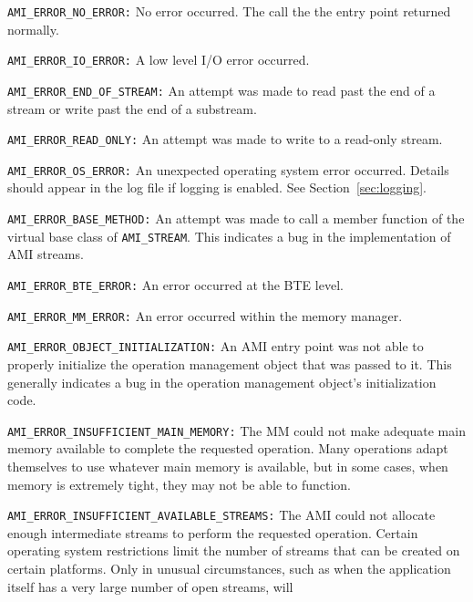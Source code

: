 \begin{description}
\item\lstinline|AMI_ERROR_NO_ERROR:| No error occurred.  The call the the
  entry point returned normally.
\item\lstinline|AMI_ERROR_IO_ERROR:| A low level I/O error occurred.
\item\lstinline|AMI_ERROR_END_OF_STREAM:| An attempt was made to read
  past the end of a stream or write past the end of a substream.
\item\lstinline|AMI_ERROR_READ_ONLY:| An attempt was made to write to a
  read-only stream.
\item\lstinline|AMI_ERROR_OS_ERROR:|  An unexpected operating system
  error occurred.  Details should appear in the log file if logging is
  enabled.  See Section~\ref{sec:logging}.
\item\lstinline|AMI_ERROR_BASE_METHOD:| An attempt was made to call a
  member function of the virtual base class of \lstinline|AMI_STREAM|.  This
  indicates a bug in the implementation of AMI streams.
\item\lstinline|AMI_ERROR_BTE_ERROR:| An error occurred at the BTE
  level.  
\item\lstinline|AMI_ERROR_MM_ERROR:| An error occurred within the memory
  manager.
\item\lstinline|AMI_ERROR_OBJECT_INITIALIZATION:| An AMI entry point was
  not able to properly initialize the operation management object that
  was passed to it.  This generally indicates a bug in the operation
  management object's initialization code.
\item\lstinline|AMI_ERROR_INSUFFICIENT_MAIN_MEMORY:| The MM could not
  make adequate main memory available to complete the requested
  operation.  Many operations adapt themselves to use whatever main
  memory is available, but in some cases, when memory is extremely
  tight, they may not be able to function.
\item\lstinline|AMI_ERROR_INSUFFICIENT_AVAILABLE_STREAMS:|
  The AMI could not allocate enough intermediate streams to perform
  the requested operation.  Certain operating system restrictions
  limit the number of streams that can be created on certain
  platforms.  Only in unusual circumstances, such as when the
  application itself has a very large number of open streams, will

\end{description}
